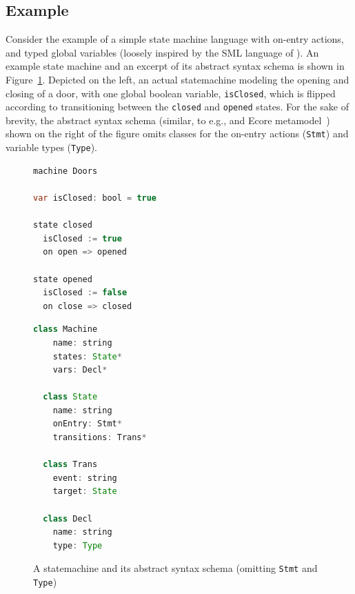 \documentclass[english,submission]{programming}
\begin{document}
\subsection{Example}
Consider the example of a simple state machine language with on-entry actions, and typed global variables (loosely inspired by the SML language of \citet{vanRozen19}). An example state machine and an excerpt of its abstract syntax schema is shown in Figure~\ref{LST:statemachines}. Depicted on the left, an actual statemachine modeling the opening and closing of a door, with one global boolean variable, \lstinline{isClosed}, which is flipped according to transitioning between the \lstinline{closed} and \lstinline{opened} states. For the sake of brevity, the abstract syntax schema (similar, to e.g., and Ecore metamodel~\cite{EMF}) shown on the right of the figure omits classes for the on-entry actions (\lstinline{Stmt}) and variable types (\lstinline{Type}).

\begin{figure}[t]
\centering
\begin{minipage}[t]{0.4\textwidth}
\begin{lstlisting}[language=java,morekeywords={machine,on,state,var}]
machine Doors

var isClosed: bool = true

state closed
  isClosed := true
  on open => opened

state opened
  isClosed := false
  on close => closed
\end{lstlisting}
\end{minipage}
\hspace*{5pt}\vline
\begin{minipage}[t]{0.4\textwidth}
\begin{lstlisting}[language=java,morekeywords={on}]
  class Machine
    name: string
    states: State*
    vars: Decl*

  class State
    name: string
    onEntry: Stmt*
    transitions: Trans*

  class Trans
    event: string
    target: State

  class Decl
    name: string
    type: Type
  \end{lstlisting}
\end{minipage}
\caption{A statemachine and its abstract syntax schema (omitting \lstinline{Stmt} and \lstinline{Type})}
\label{LST:statemachines}
\end{figure}
\end{document}
